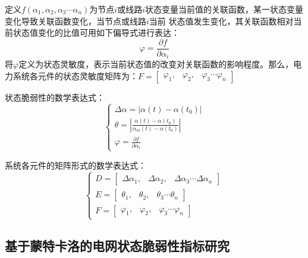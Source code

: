 定义$f\left(\alpha_{1}, \alpha_{2}, \alpha_{3} \cdots \alpha_{n}\right)$为节点$i$或线路$i$状态变量当前值的关联函数，某一状态变量变化导致关联函数变化，当节点或线路$i$当前
状态值发生变化，其关联函数相对当前状态值变化的比值可用如下偏导式进行表达：
\begin{equation}
  \varphi=\frac{\partial f}{\partial \alpha_{i}}
  \end{equation}
将$\varphi$定义为状态灵敏度，表示当前状态值的改变对关联函数的影响程度。那么，电力系统各元件的状态灵敏度矩阵为：$F=\left[\begin{array}{lll}{\varphi_{1},} & {\varphi_{2},} & {\varphi_{3} \cdots \varphi_{n}}\end{array}\right]$

状态脆弱性的数学表达式：
  \begin{equation}
  \left\{\begin{array}{l}{\Delta \alpha=\left|\alpha(t)-\alpha\left(t_{0}\right)\right|} \\
   {\theta=\left|\frac{\alpha(t)-\alpha\left(t_{0}\right)}{\alpha_{m}(t)-\alpha\left(t_{0}\right)}\right|} \\
   {\varphi=\frac{\partial f}{\partial \alpha_{i}}}\end{array}\right.
  \end{equation}
  
系统各元件的矩阵形式的数学表达式：
\begin{equation}
  \left\{\begin{array}{l}{D=\left[\begin{array}{lll}{\Delta \alpha_{1},} & {\Delta \alpha_{2},} & {\Delta \alpha_{3} \cdots \Delta \alpha_{n}}\end{array}\right]} \\
   {E=\left[\begin{array}{lll}{\theta_{1},} & {\theta_{2},} & {\theta_{3} \cdots \theta_{n}}\end{array}\right]} \\
   {F=\left[\begin{array}{lll}{\varphi_{1},} & {\varphi_{2},} & {\varphi_{3} \cdots \varphi_{n}}\end{array}\right]}\end{array}\right.
  \end{equation}

\subsection{基于蒙特卡洛的电网状态脆弱性指标研究}
\label{sec:vulneStaus}



